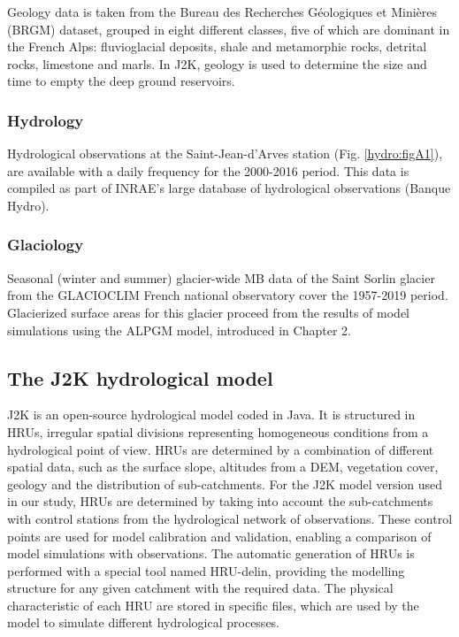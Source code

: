 Geology data is taken from the Bureau des Recherches Géologiques et Minières (BRGM) dataset, grouped in eight different classes, five of which are dominant in the French Alps: fluvioglacial deposits, shale and metamorphic rocks, detrital rocks, limestone and marls. In J2K, geology is used to determine the size and time to empty the deep ground reservoirs. 

\subsubsection{Hydrology}

Hydrological observations at the Saint-Jean-d'Arves station (Fig. \ref{hydro:figA1}), are available with a daily frequency for the 2000-2016 period. This data is compiled as part of INRAE's large database of hydrological observations (Banque Hydro).

\subsubsection{Glaciology}

Seasonal (winter and summer) glacier-wide MB data of the Saint Sorlin glacier from the GLACIOCLIM French national observatory cover the 1957-2019 period. Glacierized surface areas for this glacier proceed from the results of model simulations using the ALPGM model, introduced in Chapter 2. 

\subsection{The J2K hydrological model}

J2K is an open-source hydrological model coded in Java. It is structured in HRUs, irregular spatial divisions representing homogeneous conditions from a hydrological point of view. HRUs are determined by a combination of different spatial data, such as the surface slope, altitudes from a DEM, vegetation cover, geology and the distribution of sub-catchments. For the J2K model version used in our study, HRUs are determined by taking into account the sub-catchments with control stations from the hydrological network of observations. These control points are used for model calibration and validation, enabling a comparison of model simulations with observations. The automatic generation of HRUs is performed with a special tool named HRU-delin, providing the modelling structure for any given catchment with the required data. The physical characteristic of each HRU are stored in specific files, which are used by the model to simulate different hydrological processes. 

